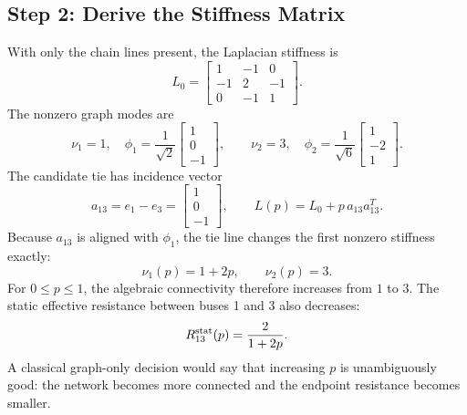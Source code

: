\subsection{Step 2: Derive the Stiffness Matrix}

With only the chain lines present, the Laplacian stiffness is
\begin{equation}
  L_0=
  \begin{bmatrix}
  1 & -1 & 0\\
  -1 & 2 & -1\\
  0 & -1 & 1
  \end{bmatrix}.
  \label{eq:framework_three_bus_L0}
\end{equation}
The nonzero graph modes are
\begin{equation}
  \nu_1=1,\quad
  \phi_1=\frac{1}{\sqrt 2}
  \begin{bmatrix}1\\0\\-1\end{bmatrix},
  \qquad
  \nu_2=3,\quad
  \phi_2=\frac{1}{\sqrt 6}
  \begin{bmatrix}1\\-2\\1\end{bmatrix}.
  \label{eq:framework_three_bus_modes}
\end{equation}
The candidate tie has incidence vector
\begin{equation}
  a_{13}=e_1-e_3=
  \begin{bmatrix}1\\0\\-1\end{bmatrix},
  \qquad
  L(p)=L_0+p\,a_{13}a_{13}^T .
  \label{eq:framework_three_bus_action}
\end{equation}
Because \(a_{13}\) is aligned with \(\phi_1\), the tie line changes the first
nonzero stiffness exactly:
\begin{equation}
  \nu_1(p)=1+2p,\qquad \nu_2(p)=3 .
  \label{eq:framework_three_bus_eigs}
\end{equation}
For \(0\le p\le 1\), the algebraic connectivity therefore increases from
\(1\) to \(3\). The static effective resistance between buses 1 and 3 also
decreases:
\begin{equation}
  R_{13}^{\rm stat}(p)=\frac{2}{1+2p}.
  \label{eq:framework_three_bus_resistance}
\end{equation}
A classical graph-only decision would say that increasing \(p\) is
unambiguously good: the network becomes more connected and the endpoint
resistance becomes smaller.

